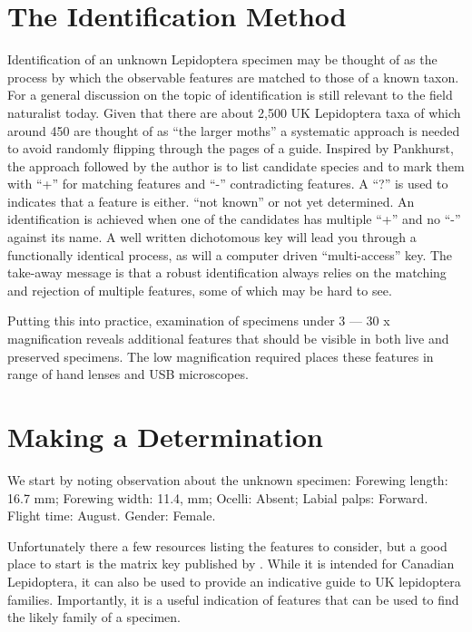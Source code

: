 \documentclass[]{article}
\begin{document}
\section*{The Identification Method}
Identification of an unknown Lepidoptera specimen may be thought of as the process by which the  observable features are matched to those of a known taxon.
For a general discussion on the topic of identification \citet{Pankhurst1978} is still relevant to the field naturalist today.
 Given that there are about 2,500 UK Lepidoptera taxa of which around 450 are thought of as \enquote{the larger moths} a systematic approach is needed to avoid randomly flipping through the pages of a guide.
 Inspired by Pankhurst, the approach followed by the author is to list candidate species and to mark them with \enquote{+} for matching features and \enquote{-} contradicting features. A \enquote{?} is used to  indicates that a feature is either. \enquote{not known} or not yet determined. An identification is achieved when one of the candidates has multiple \enquote{+} and no \enquote{-} against its name.
 A well written dichotomous key will lead you through a functionally identical process, as will a computer driven \enquote{multi-access} key.
 The take-away message is that a robust identification always relies on the matching and rejection of multiple features, some of which may be hard to see.  
 
 Putting this into practice,  examination of specimens under  3 --- 30 x magnification reveals additional features that should be visible in both live and preserved specimens. The low magnification required places these features in range of hand lenses and USB microscopes. 

\section*{Making a Determination}
We start by noting observation about the unknown specimen:
Forewing length: 16.7 mm; Forewing width: 11.4, mm;  Ocelli: Absent;  Labial palps: Forward. Flight time: August. Gender: Female.

Unfortunately there a few resources listing the features to consider, but a good place to start is the matrix key published by \citet{Dombroskie2011}. While it is intended for Canadian Lepidoptera, it can also be used to provide an indicative guide to UK lepidoptera families. Importantly, it is a useful indication of  features that can be used to find the likely family of a specimen.
\end{document}
